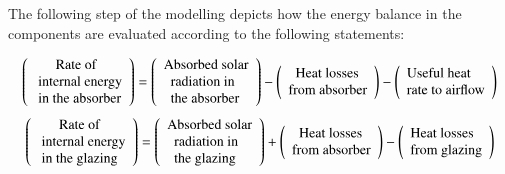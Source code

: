 The following step of the modelling depicts how the energy balance in the components are evaluated according to the following statements:

\begin{equation*}
\left( \begin{array}{l}
{\rm{\ \ \ \ \ \ Rate \ of}}\\
{\rm{\ internal \ energy }}\\
{\rm{\ in \ the \ absorber}}
\end{array} \right) = \left( \begin{array}{l}
{\rm{Absorbed \ solar}}\\
{\rm{\ \ radiation \ in}}\\
{\rm{\ \ the \ absorber}}
\end{array} \right) - \left( \begin{array}{l}
{\rm{\ \ Heat \ losses}}\\
{\rm{from \ absorber}}
\end{array} \right) - \left( \begin{array}{l}
{\rm{Useful \ heat}}\\
{\rm{ rate \ to \ airflow}}
\end{array} \right)
\label{text_equation_ABS}
\end{equation*}
\vspace*{-0.10cm}
\begin{equation*}
\left( \begin{array}{l}
{\rm{\ \ \ \ \ \ Rate \ of}}\\
{\rm{\ internal \ energy }}\\
{\rm{\ in \ the \ glazing}}
\end{array} \right) = \left( \begin{array}{l}
{\rm{Absorbed \ solar}}\\
{\rm{\ \ radiation \ in}}\\
{\rm{\ \ the \ glazing}}
\end{array} \right) + \left( \begin{array}{l}
{\rm{\ \ Heat \ losses}}\\
{\rm{from \ absorber}}
\end{array} \right) - \left( \begin{array}{l}
{\rm{Heat \ losses}}\\
{\rm{from \ glazing}}
\end{array} \right)
\label{text_equation_GLAZ}
\end{equation*}
\vspace*{-0.10cm}
